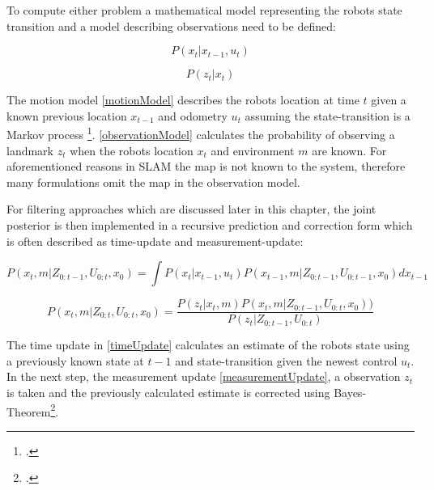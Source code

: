 To compute either problem a mathematical model representing the robots state transition and a model describing observations need to be defined:

\begin{equation}\label{motionModel}
	P(x_{t} | x_{t-1}, u_{t})
\end{equation}

\begin{equation}\label{observationModel}
	P(z_{t} | x_{t})
\end{equation}

The motion model \ref{motionModel} describes the robots location at time $ t $ given a known previous location $ x_{t-1} $ and odometry $ u_{t} $ assuming the state-transition is a Markov process \footcite{haeneltMarvoModel2006}.
\ref{observationModel} calculates the probability of observing a landmark $ z_{t} $ when the robots location $ x_{t} $ and environment $ m $ are known. For aforementioned reasons in SLAM the map is not known to the system, therefore many formulations omit the map in the observation model.


For filtering approaches which are discussed later in this chapter, the joint posterior is then implemented in a recursive prediction and correction form which is often described as time-update and measurement-update:

\begin{equation}\label{timeUpdate}
	P(x_{t}, m | Z_{0:t-1}, U_{0:t}, x_{0}) = \int P(x_{t} | x_{t-1}, u_{t}) P(x_{t-1}, m | Z_{0:t-1}, U_{0:t-1}, x_{0}) dx_{t-1}
\end{equation}


\begin{equation}\label{measurementUpdate}
	P(x_{t}, m | Z_{0:t}, U_{0:t}, x_{0}) = \frac{P(z_{t} | x_{t}, m) P(x_{t}, m | Z_{0:t-1}, U_{0:t}, x_{0}))}{P(z_{t} | Z_{0:t-1}, U_{0:t})}
\end{equation}

The time update in \ref{timeUpdate} calculates an estimate of the robots state using a previously known state at $ t - 1 $ and state-transition given the newest control $ u_{t} $.
In the next step, the measurement update \ref{measurementUpdate}, a observation $z_{t} $ is taken and the previously calculated estimate is corrected using Bayes-Theorem\footcite{durrantSlam2006}. 

